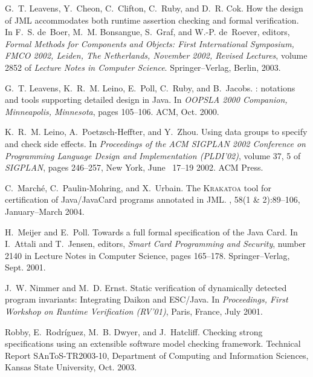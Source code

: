 \documentclass{article}
\begin{document}
\begin{thebibliography}{10}
G.~T. Leavens, Y.~Cheon, C.~Clifton, C.~Ruby, and D.~R. Cok.
\newblock How the design of {JML} accommodates both runtime assertion checking
  and formal verification.
\newblock In F.~S. de~Boer, M.~M. Bonsangue, S.~Graf, and W.-P. de~Roever,
  editors, {\em Formal Methods for Components and Objects: First International
  Symposium, FMCO 2002, Leiden, The Netherlands, November 2002, Revised
  Lectures}, volume 2852 of {\em Lecture Notes in Computer Science}.
  Springer--Verlag, Berlin, 2003.

G.~T. Leavens, K.~R.~M. Leino, E.~Poll, C.~Ruby, and B.~Jacobs.
: notations and tools supporting detailed design in {Java}.
\newblock In {\em OOPSLA 2000 Companion, Minneapolis, Minnesota}, pages
  105--106. ACM, Oct. 2000.

K.~R.~M. Leino, A.~Poetzsch-Heffter, and Y.~Zhou.
\newblock Using data groups to specify and check side effects.
\newblock In {\em Proceedings of the {ACM} {SIGPLAN} 2002 Conference on
  Programming Language Design and Implementation ({PLDI}'02)}, volume 37, 5 of
  {\em SIGPLAN}, pages 246--257, New York, June ~17--19 2002. ACM Press.

C.~March{\'e}, C.~Paulin-Mohring, and X.~Urbain.
\newblock The \textsc{Krakatoa} tool for certification of {Java/JavaCard}
  programs annotated in {JML}.
, 58(1 \& 2):89--106,
  January--March 2004.

H.~Meijer and E.~Poll.
\newblock Towards a full formal specification of the {Java Card}.
\newblock In I.~Attali and T.~Jensen, editors, {\em Smart Card Programming and
  Security}, number 2140 in Lecture Notes in Computer Science, pages 165--178.
  Springer--Verlag, Sept. 2001.

J.~W. Nimmer and M.~D. Ernst.
\newblock Static verification of dynamically detected program invariants:
  Integrating {Daikon} and {ESC/Java}.
\newblock In {\em Proceedings, First Workshop on Runtime Verification (RV'01)},
  Paris, France, July 2001.

Robby, E.~Rodr\'{i}guez, M.~B. Dwyer, and J.~Hatcliff.
\newblock Checking strong specifications using an extensible software model
  checking framework.
\newblock Technical Report {SAnToS-TR2003-10}, Department of Computing and Information Sciences,
  Kansas State University, Oct. 2003.

\end{thebibliography}
\end{document}
